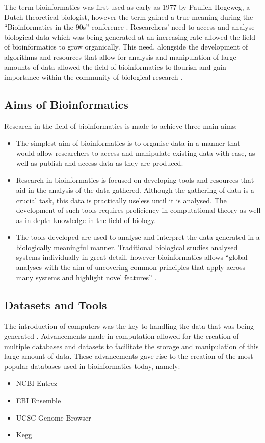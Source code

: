 \documentclass{cisfyp}
\begin{document}
The term bioinformatics was first used as early as 1977 by Paulien Hogeweg, a Dutch theoretical biologist, however the term gained a true meaning during the ``Bioinformatics in the 90s'' conference \cite{Attwood2011}. Researchers' need to access and analyse biological data which was being generated at an increasing rate allowed the field of bioinformatics to grow organically. This need, alongside the development of algorithms and resources that allow for analysis and manipulation of large amounts of data allowed the field of bioinformatics to flourish and gain importance within the community of biological research \cite{Attwood2011}.

\subsection{Aims of Bioinformatics}
Research in the field of bioinformatics is made to achieve three main aims: \cite{luscombe2001}
\begin{itemize}
	\item The simplest aim of bioinformatics is to organise data in a manner that would allow researchers to access and manipulate existing data with ease, as well as publish and access data as they are produced.
	\item Research in bioinformatics is focused on developing tools and resources that aid in the analysis of the data gathered. Although the gathering of data is a crucial task, this data is practically useless until it is analysed.
	The development of such tools requires proficiency in computational theory as well as in-depth knowledge in the field of biology. 
	\item The tools developed are used to analyse and interpret the data generated in a biologically meaningful manner. Traditional biological studies analysed systems individually in great detail, however bioinformatics allows ``global analyses with the aim of 
	uncovering common principles that apply across many systems and highlight novel features'' \cite{luscombe2001}.
\end{itemize}

\subsection{Datasets and Tools}
The introduction of computers was the key to handling the data that was being generated \cite{Attwood2011}. Advancements made in computation allowed for the creation of multiple databases and datasets to facilitate the storage and manipulation of this 
large amount of data. These advancements gave rise to the creation of the most popular databases used in bioinformatics today, namely:
\begin{itemize}
	\item NCBI Entrez \cite{Maglott2004}
	\item EBI Ensemble \cite{Flicek2012}
	\item UCSC Genome Browser \cite{Kent2002}
	\item Kegg \cite{Kanehisa2011}
\end{itemize}
\end{document}
